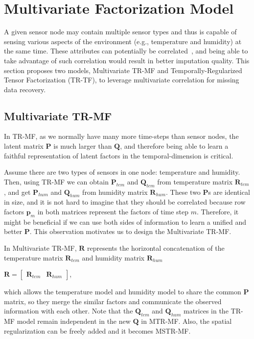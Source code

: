 
\section{Multivariate Factorization Model} \label{sec:tf}
A given sensor node may contain multiple sensor types and thus is capable of sensing various aspects of the environment (e.g., temperature and humidity) at the same time.
These attributes can potentially be correlated~\cite{deshpande2005}, and being able to take advantage of such correlation would result in better imputation quality.
This section proposes two models, Multivariate TR-MF and Temporally-Regularized Tensor Factorization (TR-TF), to leverage multivariate correlation for missing data recovery.

\subsection{Multivariate TR-MF} %
In TR-MF, as we normally have many more time-steps than sensor nodes, the latent matrix $\mathbf{P}$ is much larger than $\mathbf{Q}$, and therefore being able to learn a faithful representation of latent factors in the temporal-dimension is critical. 

Assume there are two types of sensors in one node: temperature and humidity.
Then, using TR-MF we can obtain $\mathbf{P}_{tem}$ and $\mathbf{Q}_{tem}$ from temperature matrix $\mathbf{R}_{tem}$, and get $\mathbf{P}_{hum}$ and $\mathbf{Q}_{hum}$ from humidity matrix $\mathbf{R}_{hum}$.
These two $\mathbf{P}$s are identical in size, and it is not hard to imagine that they should be correlated because row factors $\mathbf{p}_m$ in both matrices represent the factors of time step $m$.
Therefore, it might be beneficial if we can use both sides of information to learn a unified and better $\mathbf{P}$.
This observation motivates us to design the Multivariate TR-MF.

In Multivariate TR-MF, $\mathbf{R}$ represents the horizontal concatenation of the temperature matrix $\mathbf{R}_{tem}$ and humidity matrix $\mathbf{R}_{hum}$

\begin{center}
 $\mathbf{R} = \begin{bmatrix}\mathbf{R}_{tem} & \mathbf{R}_{hum} \end{bmatrix}$,
\end{center} 
which allows the temperature model and humidity model to share the common $\mathbf{P}$ matrix, so they merge the similar factors and communicate the observed information with each other.
Note that the $\mathbf{Q}_{tem}$ and $\mathbf{Q}_{hum}$ matrices in the TR-MF model remain independent in the new $\mathbf{Q}$ in MTR-MF.
Also, the spatial regularization can be freely added and it becomes MSTR-MF.

